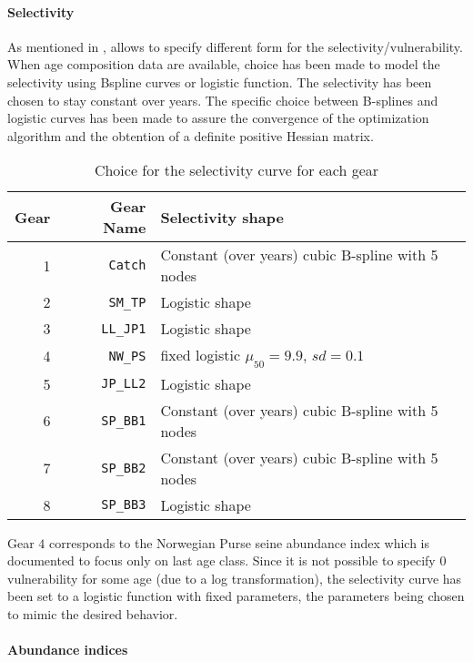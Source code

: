 \paragraph{Selectivity}
As mentioned in \cite{Martell12},	 \iscam allows to specify different form for the
selectivity/vulnerability.  When age composition data are available,
choice has been made to model  the selectivity using Bspline curves or
logistic function.  The selectivity has  been chosen to  stay constant
over years. The specific choice between B-splines and logistic curves has been made to 
assure the convergence of the optimization algorithm and the obtention of a definite positive Hessian matrix.



\begin{table}[ht]
\centering
\begin{tabular}{rrp{8cm}}
  \hline
  Gear & Gear Name & Selectivity shape \\ 
  \hline
1 & \verb+Catch+ & Constant (over years) cubic B-spline with 5 nodes \\
2 & \verb+SM_TP+ & Logistic shape \\ 	
3 & \verb+LL_JP1+ & Logistic shape \\
4 & \verb+NW_PS+ & fixed logistic $\mu_{50}=9.9$, $sd=0.1$\\
5 & \verb+JP_LL2+ & Logistic shape \\
6 & \verb+SP_BB1+ & Constant (over years) cubic B-spline with 5 nodes \\
7 & \verb+SP_BB2+ & Constant (over years) cubic B-spline with 5 nodes \\
8 & \verb+SP_BB3+ & Logistic shape \\
\hline
\end{tabular}
\caption{Choice for the selectivity curve for each gear}
\label{table:selectivity}
\end{table}


Gear  $4$ corresponds  to the  Norwegian Purse  seine abundance  index
which is documented  to focus  only on  last age  class. Since  it is  not possible  to
specify $0$ vulnerability for some  age (due to a log transformation),
the selectivity curve  has been set to a logistic  function with fixed
parameters, the parameters being chosen to mimic the desired behavior.


\paragraph{Abundance indices}



